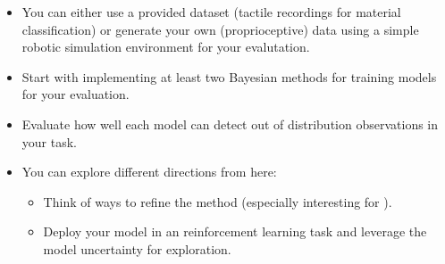\documentclass[a4paper]{article}
\begin{document}
\begin{itemize}
  \item You can either use a provided dataset (tactile recordings for material classification) or generate your own (proprioceptive) data using a simple robotic simulation environment for your evalutation.
  \item Start with implementing at least two Bayesian methods for training models for your evaluation.
  \item Evaluate how well each model can detect out of distribution observations in your task.
  \item You can explore different directions from here:
  \begin{itemize}
    \item Think of ways to refine the method (especially interesting for \cite{Blundell2015}).
    \item Deploy your model in an reinforcement learning task and leverage the model uncertainty for exploration.
  \end{itemize}
\end{itemize}





\end{document}
